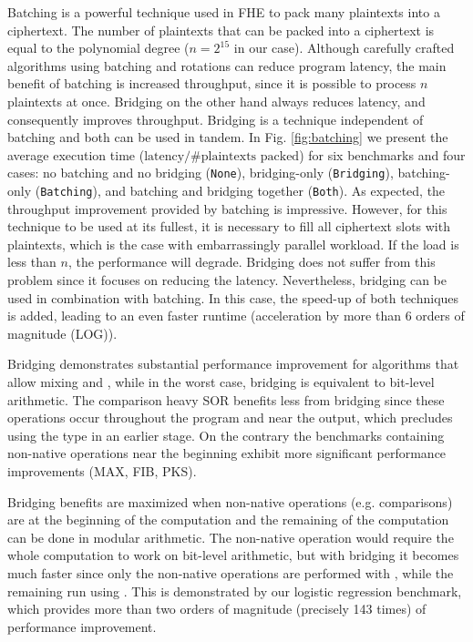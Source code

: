  Batching is a powerful technique used in FHE to pack many plaintexts into a ciphertext. The number of plaintexts that can be packed into a ciphertext is equal to the polynomial degree ($n = 2^{15}$ in our case). Although carefully crafted algorithms using batching and rotations can reduce program latency, the main benefit of batching is increased throughput, since it is possible to process $n$ plaintexts at once. Bridging on the other hand always reduces latency, and consequently improves throughput.
Bridging is a technique independent of batching and both can be used in tandem.
In Fig. \ref{fig:batching} we present the average execution time ($\text{latency} / \text{\# plaintexts packed}$) for six benchmarks and four cases: no batching and no bridging (\texttt{None}), bridging-only (\texttt{Bridging}), batching-only (\texttt{Batching}), and batching and bridging together (\texttt{Both}).
As expected, the throughput improvement provided by batching is impressive. However, for this technique to be used at its fullest, it is necessary to fill all ciphertext slots with plaintexts, which is the case with embarrassingly parallel workload. If the load is less than $n$, the performance will degrade.
Bridging does not suffer from this problem since it focuses on reducing the latency.
Nevertheless, bridging can be used in combination with batching. In this case, the speed-up of both techniques is added, leading to an even faster runtime (acceleration by more than 6 orders of magnitude (LOG)).

Bridging demonstrates substantial performance improvement for algorithms that allow mixing \secuint{} and \secmod{}, while in the worst case, bridging is equivalent to bit-level arithmetic. 
The comparison heavy SOR benefits less from bridging since these operations occur throughout the program and near the output, which precludes using the \secmod{} type in an earlier stage. On the contrary the benchmarks containing non-native operations near the beginning exhibit more significant performance improvements (MAX, FIB, PKS).

Bridging benefits are maximized when non-native operations (e.g. comparisons) are at the beginning of the computation and the remaining of the computation can be done in modular arithmetic. The non-native operation would require the whole computation to work on bit-level arithmetic, but with bridging it becomes much faster since only the non-native operations are performed with \secuint, while the remaining run using \secmod. This is demonstrated by our logistic regression benchmark, which provides more than two orders of magnitude (precisely 143 times) of performance improvement.

